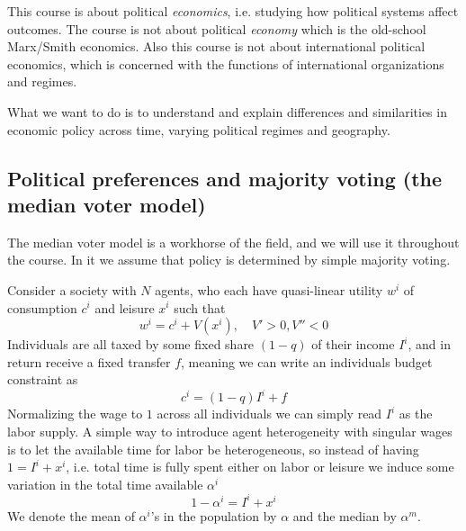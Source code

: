 This course is about political \textit{economics}, i.e. studying how political systems affect outcomes. The course is not about political \textit{economy} which is the old-school Marx/Smith economics. Also this course is not about international political economics, which is concerned with the functions of international organizations and regimes.

What we want to do is to understand and explain differences and similarities in economic policy across time, varying political regimes and geography. 

\subsection{Political preferences and majority voting (the median voter model)}
The median voter model is a workhorse of the field, and we will use it throughout the course. In it we assume that policy is determined by simple majority voting. 

Consider a society with $N$ agents, who each have quasi-linear utility $w^i$ of consumption $c^i$ and leisure $x^i$ such that 
\begin{equation}
  w^i = c^i + V(x^i), \quad V'> 0, V''<0
\end{equation}
Individuals are all taxed by some fixed share $(1-q)$ of their income $I^i$, and in return receive a fixed transfer $f$, meaning we can write an individuals budget constraint as 
\begin{equation}
  c^i = (1-q)I^i + f
\end{equation}
Normalizing the wage to $1$ across all individuals we can simply read $I^i$ as the labor supply. A simple way to introduce agent heterogeneity with singular wages is to let the available time for labor be heterogeneous, so instead of having $1=I^i + x^i$, i.e. total time is fully spent either on labor or leisure we induce some variation in the total time available $\alpha^i$ 
\begin{equation}
  1- \alpha^i = I^i + x^i
\end{equation}
We denote the mean of $\alpha^i$'s in the population by $\alpha$ and the median by $\alpha^m$. 

